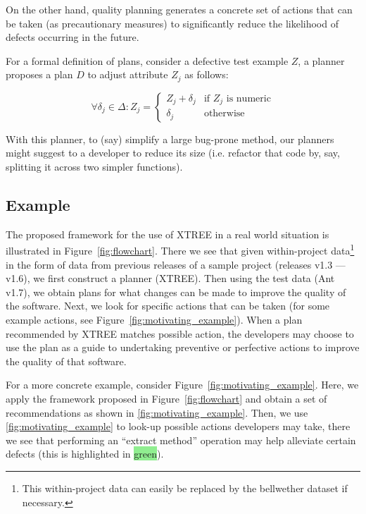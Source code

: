 \documentclass[10pt,journal,compsoc]{IEEEtran}
\newcommand{\fig}[1]{Figure~\ref{fig:#1}}
\begin{document}
On the other hand, quality planning generates a concrete set of actions that can be taken (as precautionary measures) to significantly reduce the likelihood of defects occurring in the future.

For a formal definition of plans, consider a defective test example $Z$, a planner
proposes a plan $D$ to adjust attribute $Z_j$ as follows:

{\small\[
\forall \delta_j \in \Delta :  Z_j =  
\begin{cases}
     Z_j + \delta_j& \text{if $Z_j$ is numeric}\\
    \delta_j              & \text{otherwise}
\end{cases}
\]}

With this planner, to (say) simplify a large bug-prone method, our planners
might suggest to a developer to reduce its size (i.e. refactor that
code by, say, splitting it across two simpler functions).

\subsection{Example}


The proposed framework for the use of XTREE in a real world situation is illustrated in \fig{flowchart}. There we see that given within-project data\footnote{This within-project data can easily be replaced by the bellwether dataset if necessary.} in the form of data from previous releases of a sample project (releases v1.3 --- v1.6), we first construct a planner (XTREE). Then using the test data (Ant v1.7), we obtain plans for what changes can be made to improve the quality of the software. Next, we look for specific actions that can be taken (for some example actions, see \fig{motivating_example}\protect{}). When a plan recommended by XTREE matches possible action, the developers may choose to use the plan as a guide to undertaking preventive or perfective  actions to improve the quality of that software.


For a more concrete example, consider \fig{motivating_example}. Here, we apply the framework proposed in \fig{flowchart} and obtain a set of recommendations as shown in \ref{fig:motivating_example}\protect{}. Then, we use \ref{fig:motivating_example}\protect{} to look-up possible actions developers may take, there we see that performing an ``extract method'' operation may help alleviate certain defects (this is highlighted in {\colorbox{lightgreen}{green}}). 
\end{document}

